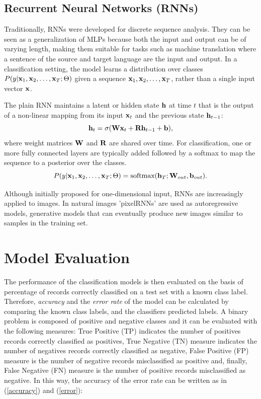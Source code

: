 \documentclass[final,a4paper,12pt,english]{UnicaPhdThesis3}
\begin{document}
\subsection{Recurrent Neural Networks (RNNs)}
\label{sec:rnns}
Traditionally, RNNs were developed for discrete sequence analysis. They can be seen as a generalization of MLPs because both the input and output can be of varying length, making them suitable for tasks such as machine translation where a sentence of the source and target language are the input and output. In a classification setting, the model learns a distribution over classes $P(y | {\bf x}_{1}, {\bf x}_{2}, \ldots, {\bf x}_{T}; \Theta)$ given a sequence ${\bf x}_{1}, {\bf x}_{2}, \ldots, {\bf x}_{T}$, rather than a single input vector ${\bf x}$.

The plain RNN maintains a latent or hidden state ${\bf h}$ at time $t$ that is the output of a non-linear mapping from its input ${\bf x}_{t}$ and the previous state ${\bf h}_{t-1}$:
\begin{equation}
{\bf h}_{t} = \sigma({\bf W}{\bf x}_{t} + {\bf R}{\bf h}_{t - 1} + {\bf b}),
\end{equation}
where weight matrices ${\bf W}$ and ${\bf R}$ are shared over time. For classification, one or more fully connected layers are typically added followed by a softmax to map the sequence to a posterior over the classes. 
\begin{equation}
P(y | {\bf x}_{1}, {\bf x}_{2}, \ldots, {\bf x}_{T}; \Theta) = \text{softmax}( {\bf h}_{T}; {\bf W}_{out}, {\bf b}_{out}).
\end{equation}

Although initially proposed for one-dimensional input, RNNs are increasingly applied to images. In natural images 'pixelRNNs' are used as autoregressive models, generative models that can eventually produce new images similar to samples in the training set. 

\section{Model Evaluation} \label{ME} %
The performance of the classification models is then evaluated on the basis of percentage of records correctly classified on a test set with a known class label. Therefore, \textit{accuracy} and the \textit{error rate} of the model can be calculated by comparing the known class labels, and the classifiers predicted labels. A binary problem is composed of positive and negative classes and it can be evaluated with the following measures: True Positive (\acs{TP}) indicates the number of positives records correctly classified as positives, True Negative (\acs{TN}) measure indicates the number of negatives records correctly classified as negative, False Positive (\acs{FP}) measure is the number of negative records misclassified as positive and, finally, False Negative (\acs{FN}) measure is the number of positive records misclassified as negative. In this way, the accuracy of the error rate can be written as in (\ref{accuracy}) and (\ref{error}):
\end{document}
